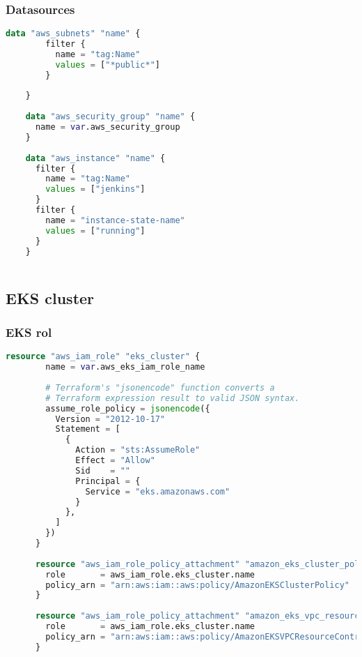 \subsubsection{
{Datasources}}

\begin{lstlisting}[language=terraform]
    data "aws_subnets" "name" {
        filter {
          name = "tag:Name"
          values = ["*public*"]
        }
      
    }
    
    data "aws_security_group" "name" {
      name = var.aws_security_group
    }
    
    data "aws_instance" "name" {
      filter {
        name = "tag:Name"
        values = ["jenkins"]
      }
      filter {
        name = "instance-state-name"
        values = ["running"]
      }
    }
    
\end{lstlisting}


\subsection{
{EKS cluster}}
\label{sec:EKS cluster}

\subsubsection{
{EKS rol}}

\begin{lstlisting}[language=terraform]
    resource "aws_iam_role" "eks_cluster" {
        name = var.aws_eks_iam_role_name
      
        # Terraform's "jsonencode" function converts a
        # Terraform expression result to valid JSON syntax.
        assume_role_policy = jsonencode({
          Version = "2012-10-17"
          Statement = [
            {
              Action = "sts:AssumeRole"
              Effect = "Allow"
              Sid    = ""
              Principal = {
                Service = "eks.amazonaws.com"
              }
            },
          ]
        })
      }
      
      resource "aws_iam_role_policy_attachment" "amazon_eks_cluster_policy" {
        role       = aws_iam_role.eks_cluster.name
        policy_arn = "arn:aws:iam::aws:policy/AmazonEKSClusterPolicy"
      }
      
      resource "aws_iam_role_policy_attachment" "amazon_eks_vpc_resource_controller" {
        role       = aws_iam_role.eks_cluster.name
        policy_arn = "arn:aws:iam::aws:policy/AmazonEKSVPCResourceController"
      }
      
\end{lstlisting}

